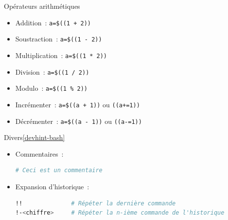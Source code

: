 \documentclass{beamer}
\begin{document}
    \begin{frame}[fragile]{Opérateurs arithmétiques}
        \begin{itemize}
            \item Addition~: \lstinline{a=$((1 + 2))}
            \item Soustraction~: \lstinline{a=$((1 - 2))}
            \item Multiplication~: \lstinline{a=$((1 * 2))}
            \item Division~: \lstinline{a=$((1 / 2))}
            \item Modulo~: \lstinline{a=$((1 % 2))}
            \item Incrémenter~: \lstinline{a=$((a + 1))} ou \lstinline{((a+=1))}
            \item Décrémenter~: \lstinline{a=$((a - 1))} ou \lstinline{((a-=1))}
        \end{itemize}
    \end{frame}

    \begin{frame}[fragile]{Divers\cref{devhint-bash}}
        \begin{itemize}
            \item Commentaires~:
            \begin{lstlisting}[language=bash]
# Ceci est un commentaire
            \end{lstlisting}
            \item Expansion d'historique~:
            \begin{lstlisting}[language=bash]
!!              # Répéter la dernière commande
!-<chiffre>     # Répéter la n-ième commande de l'historique
            \end{lstlisting}
        \end{itemize}
    \end{frame}
\end{document}
